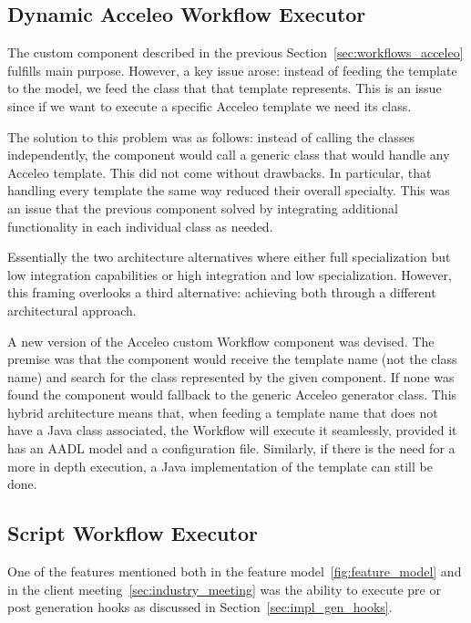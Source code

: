 \subsection{Dynamic Acceleo Workflow Executor}
\label{sec:workflows_dynamic_executor}

The custom component described in the previous Section~\ref{sec:workflows_acceleo} fulfills main purpose. However, a key issue arose: instead of feeding the template to the model, we feed the class that that template represents. This is an issue since if we want to execute a specific Acceleo template we need its class.

The solution to this problem was as follows: instead of calling the classes independently, the component would call a generic class that would handle any Acceleo template. This did not come without drawbacks. In particular, that handling every template the same way reduced their overall specialty. This was an issue that the previous component solved by integrating additional functionality in each individual class as needed.

Essentially the two architecture alternatives where either full specialization but low integration capabilities or high integration and low specialization. However, this framing overlooks a third alternative: achieving both through a different architectural approach.

A new version of the Acceleo custom Workflow component was devised. The premise was that the component would receive the template name (not the class name) and search for the class represented by the given component. If none was found the component would fallback to the generic Acceleo generator class. This hybrid architecture means that, when feeding a template name that does not have a Java class associated, the Workflow will execute it seamlessly, provided it has an \gls{AADL} model and a configuration file. Similarly, if there is the need for a more in depth execution, a Java implementation of the template can still be done.


\subsection{Script Workflow Executor}
\label{sec:workflows_script_executor}

One of the features mentioned both in the feature model~\ref{fig:feature_model} and in the client meeting~\ref{sec:industry_meeting} was the ability to execute pre or post generation hooks as discussed in Section~\ref{sec:impl_gen_hooks}. 

